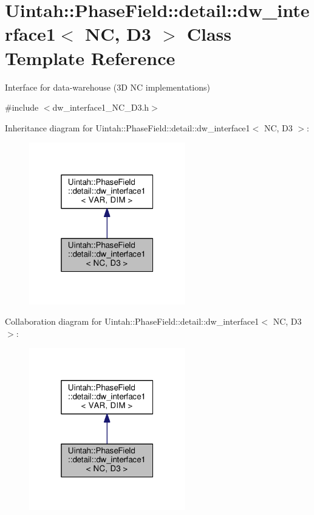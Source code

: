 \hypertarget{classUintah_1_1PhaseField_1_1detail_1_1dw__interface1_3_01NC_00_01D3_01_4}{}\section{Uintah\+:\+:Phase\+Field\+:\+:detail\+:\+:dw\+\_\+interface1$<$ NC, D3 $>$ Class Template Reference}
\label{classUintah_1_1PhaseField_1_1detail_1_1dw__interface1_3_01NC_00_01D3_01_4}


Interface for data-\/warehouse (3D NC implementations)  




{\ttfamily \#include $<$dw\+\_\+interface1\+\_\+\+N\+C\+\_\+\+D3.\+h$>$}



Inheritance diagram for Uintah\+:\+:Phase\+Field\+:\+:detail\+:\+:dw\+\_\+interface1$<$ NC, D3 $>$\+:\nopagebreak
\begin{figure}[H]
\begin{center}
\leavevmode
\includegraphics[width=193pt]{classUintah_1_1PhaseField_1_1detail_1_1dw__interface1_3_01NC_00_01D3_01_4__inherit__graph}
\end{center}
\end{figure}


Collaboration diagram for Uintah\+:\+:Phase\+Field\+:\+:detail\+:\+:dw\+\_\+interface1$<$ NC, D3 $>$\+:\nopagebreak
\begin{figure}[H]
\begin{center}
\leavevmode
\includegraphics[width=193pt]{classUintah_1_1PhaseField_1_1detail_1_1dw__interface1_3_01NC_00_01D3_01_4__coll__graph}
\end{center}
\end{figure}
